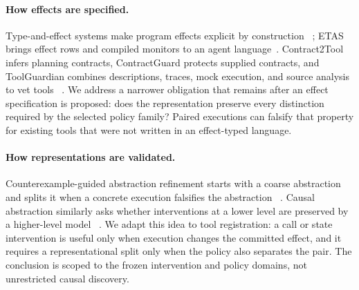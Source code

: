 \paragraph{How effects are specified.}
Type-and-effect systems make program effects explicit by construction
~\cite{lucassen1988effects}; ETAS brings effect rows and compiled monitors to an
agent language~\cite{etas2026}.  Contract2Tool infers planning contracts,
ContractGuard protects supplied contracts, and ToolGuardian combines
descriptions, traces, mock execution, and source analysis to vet tools
~\cite{contract2tool,contractguard,toolguardian2026}.  We address a narrower
obligation that remains after an effect specification is proposed: does the
representation preserve every distinction required by the selected policy
family?  Paired executions can falsify that property for existing tools that
were not written in an effect-typed language.

\paragraph{How representations are validated.}
Counterexample-guided abstraction refinement starts with a coarse abstraction
and splits it when a concrete execution falsifies the abstraction
~\cite{clarke2000cegar}.  Causal abstraction similarly asks whether
interventions at a lower level are preserved by a higher-level model
~\cite{pearl2009causality,beckers2019abstracting,geiger2022inducing}.  We adapt
this idea to tool registration: a call or state intervention is useful only
when execution changes the committed effect, and it requires a representational
split only when the policy also separates the pair.  The conclusion is scoped
to the frozen intervention and policy domains, not unrestricted causal
discovery.

